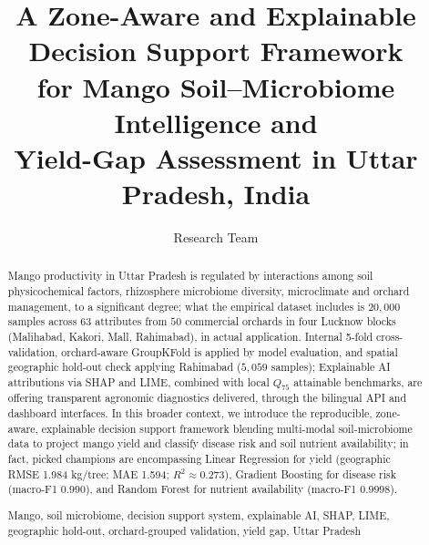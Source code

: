 \documentclass[runningheads,a4paper,oribibl]{llncs}
\newcommand{\keywords}[1]{\par\addvspace\baselineskip
\noindent\keywordname\enspace\ignorespaces#1}
\begin{document}
\mainmatter

\title{A Zone-Aware and Explainable Decision Support Framework\\for Mango Soil--Microbiome Intelligence and\\Yield-Gap Assessment in Uttar Pradesh, India}


\author{Research Team}




\maketitle

\begin{abstract}
Mango productivity in Uttar Pradesh is regulated by interactions among soil physicochemical factors, rhizosphere microbiome diversity, microclimate and orchard management, to a significant degree; what the empirical dataset includes is $20{,}000$ samples across $63$ attributes from $50$ commercial orchards in four Lucknow blocks (Malihabad, Kakori, Mall, Rahimabad), in actual application. Internal 5-fold cross-validation, orchard-aware GroupKFold is applied by model evaluation, and spatial geographic hold-out check applying Rahimabad ($5{,}059$ samples); Explainable AI attributions via SHAP and LIME, combined with local $Q_{75}$ attainable benchmarks, are offering transparent agronomic diagnostics delivered, through the bilingual API and dashboard interfaces. In this broader context, we introduce the reproducible, zone-aware, explainable decision support framework blending multi-modal soil-microbiome data to project mango yield and classify disease risk and soil nutrient availability; in fact, picked champions are encompassing Linear Regression for yield (geographic RMSE 1.984 kg/tree; MAE 1.594; $R^2 \approx 0.273$), Gradient Boosting for disease risk (macro-F1 $0.990$), and Random Forest for nutrient availability (macro-F1 $0.9998$).

\keywords{Mango, soil microbiome, decision support system, explainable AI, SHAP, LIME, geographic hold-out, orchard-grouped validation, yield gap, Uttar Pradesh}
\end{abstract}
\end{document}
